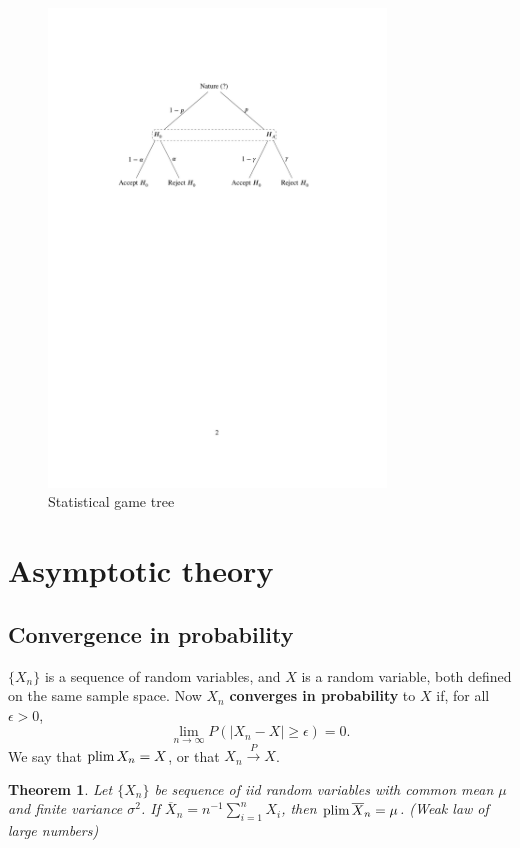 \documentclass[twoside]{article}
\newtheorem{theorem}{Theorem}%
\begin{document}
\begin{figure}[tb]
  \begin{center}
\includegraphics[width=0.8\textwidth]{../graphs/B.pdf}
  \end{center}
\caption{Statistical game tree}\label{fig:B}
\end{figure}


\section{Asymptotic theory}\label{sec:asymptotics}

\subsection{Convergence in probability}

$\{X_n\}$ is a sequence of random variables, and $X$ is a random variable, both
defined on the same sample space. Now $X_n$ \textbf{converges in probability} to $X$
if, for all $\epsilon>0$,
\[\lim_{n\rightarrow\infty} P( |X_n-X|\geq \epsilon) = 0.\] We say that
$\operatorname{plim} X_n = X$, or that $X_n \xrightarrow{P} X$.

\begin{theorem}
Let $\{X_n\}$ be sequence of iid random variables with common mean $\mu$ and
finite variance $\sigma^2$. If $\overline{X}_n = n^{-1}\sum_{i=1}^n X_i$, then
$\operatorname{plim} \overline{X}_n=\mu$. (Weak law of large numbers)
\end{theorem}
\end{document}
